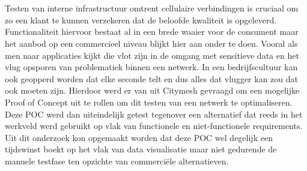 
%
%
%
%
%

%

\chapter*{}

Testen van interne infrastructuur omtrent cellulaire verbindingen is cruciaal om zo een klant te kunnen verzekeren dat de beloofde kwaliteit is opgeleverd. Functionaliteit hiervoor bestaat al in een brede waaier voor de consument maar het aanbod op een commercieel niveau blijkt hier aan onder te doen. Vooral als men naar applicaties kijkt die vlot zijn in de omgang met sensitieve data en het vlug opsporen van problematiek binnen een netwerk. In een bedrijfscultuur kan ook geopperd worden dat elke seconde telt en dus alles dat vlugger kan zou dat ook moeten zijn. Hierdoor werd er van uit Citymesh gevraagd om een mogelijke Proof of Concept uit te rollen om dit testen van een netwerk te optimaliseren. Deze POC werd dan uiteindelijk getest tegenover een alternatief dat reeds in het werkveld werd gebruikt op vlak van functionele en niet-functionele requirements. Uit dit onderzoek kon opgemaakt worden dat deze POC wel degelijk een tijdswinst boekt op het vlak van data visualisatie maar niet gedurende de manuele testfase ten opzichte van commerciële alternatieven. 

